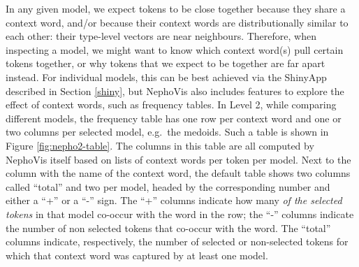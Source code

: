 \documentclass[
]{book}
\begin{document}
In any given model, we expect tokens to be close together because they share a context word, and/or because their context words are distributionally similar to each other: their type-level vectors are near neighbours. Therefore, when inspecting a model, we might want to know which context word(s) pull certain tokens together, or why tokens that we expect to be together are far apart instead. For individual models, this can be best achieved via the ShinyApp described in Section \ref{shiny}, but NephoVis also includes features to explore the effect of context words, such as frequency tables.
In Level 2, while comparing different models, the frequency table has one row per context word and one or two columns per selected model, e.g.~the medoids. Such a table is shown in Figure \ref{fig:nepho2-table}.
The columns in this table are all computed by NephoVis itself based on lists of context words per token per model. Next to the column with the name of the context word, the default table shows two columns called ``total'' and two per model, headed by the corresponding number and either a ``+'' or a ``-'' sign. The ``+'' columns indicate how many \emph{of the selected tokens} in that model co-occur with the word in the row; the ``-'' columns indicate the number of non selected tokens that co-occur with the word. The ``total'' columns indicate, respectively, the number of selected or non-selected tokens for which that context word was captured by at least one model.
\end{document}
